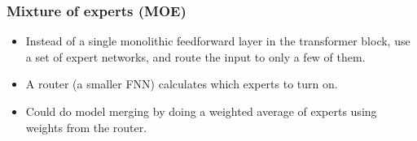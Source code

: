\documentclass[../ds]{subfiles}
\begin{document}
\subsubsection{Mixture of experts (MOE)}
\begin{itemize}
    \item Instead of a single monolithic feedforward layer in the transformer block, use a set of expert networks, and route the input to only a few of them.
    \item A router (a smaller FNN) calculates which experts to turn on.
    \item Could do model merging by doing a weighted average of experts using weights from the router.
\end{itemize}
\end{document}
